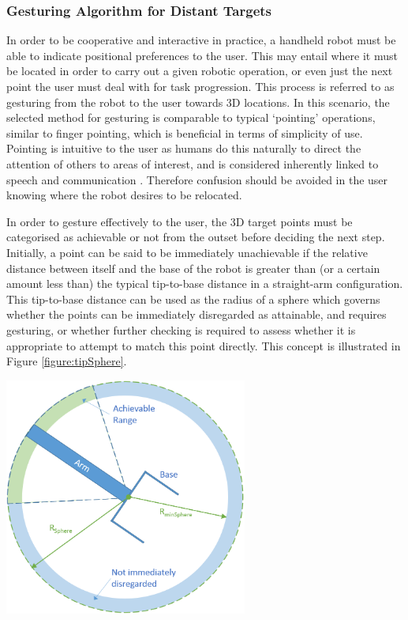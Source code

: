 \documentclass[11pt]{article}
\begin{document}
\subsubsection{Gesturing Algorithm for Distant Targets}
In order to be cooperative and interactive in practice, a handheld robot must be able to indicate positional preferences to the user. This may entail where it must be located in order to carry out a given robotic operation, or even just the next point the user must deal with for task progression. This process is referred to as gesturing from the robot to the user towards 3D locations. In this scenario, the selected method for gesturing is comparable to typical `pointing' operations, similar to finger pointing, which is beneficial in terms of simplicity of use. Pointing is intuitive to the user as humans do this naturally to direct the attention of others to areas of interest, and is considered inherently linked to speech and communication \cite{butterworth2003}. Therefore confusion should be avoided in the user knowing where the robot desires to be relocated.

In order to gesture effectively to the user, the 3D target points must be categorised as achievable or not from the outset before deciding the next step. Initially, a point can be said to be immediately unachievable if the relative distance between itself and the base of the robot is greater than (or a certain amount less than) the typical tip-to-base distance in a straight-arm configuration. This tip-to-base distance can be used as the radius of a sphere which governs whether the points can be immediately disregarded as attainable, and requires gesturing, or whether further checking is required to assess whether it is appropriate to attempt to match this point directly. This concept is illustrated in Figure \ref{figure:tipSphere}.

\begin{center}
\includegraphics[width=0.6\textwidth]{images/tipSphere.png}
\label{figure:tipSphere}
\end{center}
\end{document}
